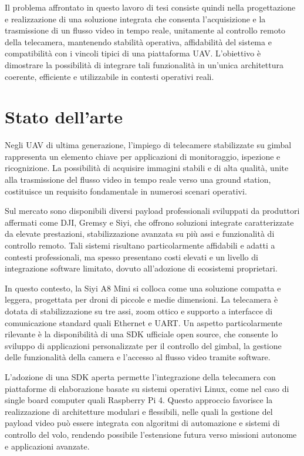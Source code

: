 Il problema affrontato in questo lavoro di tesi consiste quindi nella progettazione e realizzazione di una soluzione integrata che consenta l’acquisizione e la trasmissione di un flusso video in tempo reale, unitamente al controllo remoto della telecamera, mantenendo stabilità operativa, affidabilità del sistema e compatibilità con i vincoli tipici di una piattaforma UAV. L’obiettivo è dimostrare la possibilità di integrare tali funzionalità in un’unica architettura coerente, efficiente e utilizzabile in contesti operativi reali.

\section{Stato dell'arte}

Negli UAV di ultima generazione, l’impiego di telecamere stabilizzate su gimbal rappresenta un elemento chiave per applicazioni di monitoraggio, ispezione e ricognizione. La possibilità di acquisire immagini stabili e di alta qualità, unite alla trasmissione del flusso video in tempo reale verso una ground station, costituisce un requisito fondamentale in numerosi scenari operativi.

Sul mercato sono disponibili diversi payload professionali sviluppati da produttori affermati come DJI, Gremsy e Siyi, che offrono soluzioni integrate caratterizzate da elevate prestazioni, stabilizzazione avanzata su più assi e funzionalità di controllo remoto. Tali sistemi risultano particolarmente affidabili e adatti a contesti professionali, ma spesso presentano costi elevati e un livello di integrazione software limitato, dovuto all’adozione di ecosistemi proprietari.

In questo contesto, la Siyi A8 Mini si colloca come una soluzione compatta e leggera, progettata per droni di piccole e medie dimensioni. La telecamera è dotata di stabilizzazione su tre assi, zoom ottico e supporto a interfacce di comunicazione standard quali Ethernet e UART. Un aspetto particolarmente rilevante è la disponibilità di una SDK ufficiale open source, che consente lo sviluppo di applicazioni personalizzate per il controllo del gimbal, la gestione delle funzionalità della camera e l’accesso al flusso video tramite software.

L’adozione di una SDK aperta permette l’integrazione della telecamera con piattaforme di elaborazione basate su sistemi operativi Linux, come nel caso di single board computer quali Raspberry Pi 4. Questo approccio favorisce la realizzazione di architetture modulari e flessibili, nelle quali la gestione del payload video può essere integrata con algoritmi di automazione e sistemi di controllo del volo, rendendo possibile l’estensione futura verso missioni autonome e applicazioni avanzate.

